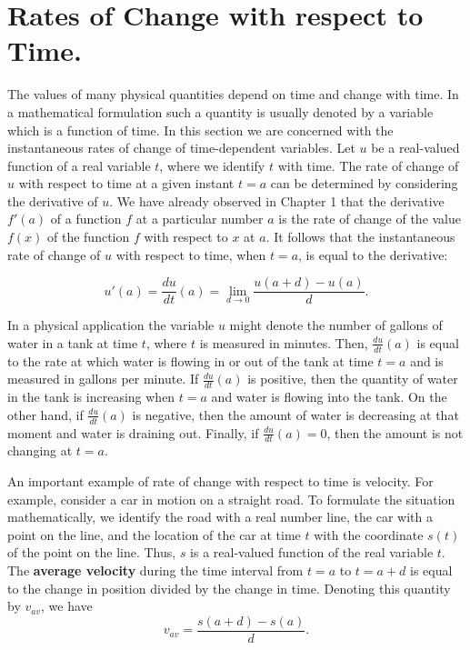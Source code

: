 \section{Rates of Change with respect to Time.}\label{sec 2.3}
The values of many physical quantities depend on time and change with time. In a mathematical formulation such a quantity is usually denoted by a variable which is a function of time. In this section we are concerned with the instantaneous rates of change of time-dependent variables. Let $u$ be a real-valued function of a real variable $t$, where we identify $t$ with time. The rate of change of $u$ with respect to time at a given instant $t = a$ can be determined by considering the derivative of $u$. We have already observed in Chapter 1 that the derivative $f'(a)$ of a function $f$ at a particular number $a$ is the rate of change of the value $f(x)$ of the function $f$ with respect to $x$ at $a$. It follows that the instantaneous rate of change of $u$ with respect to time, when $t = a$, is equal to the derivative:

$$
u'(a) = \frac{du}{dt} (a) = \lim_{d \rightarrow 0}\frac{u(a + d) - u(a)}{d}.
$$

In a physical application the variable $u$ might denote the number of gallons of water in a tank at time $t$, where $t$ is measured in minutes. Then, $\frac{du}{dt}(a)$ is equal to the rate at which water is flowing in or out of the tank at time $t = a$ and is measured in gallons per minute. If $\frac{du}{dt}(a)$ is positive, then the quantity of water in the tank is increasing when $t = a$ and water is flowing into the tank. On the other hand, if $\frac{du}{dt}(a)$ is negative, then the amount of water is decreasing at that moment and water is draining out. Finally, if $\frac{du}{dt}(a) = 0$, then the amount is not changing
at $t = a$.

An important example of rate of change with respect to time is velocity. For example, consider a car in motion on a straight road. To formulate the situation mathematically, we identify the road with a real number line, the car with a point on the line, and the location of the car at time $t$ with the coordinate $s(t)$ of the point on the line. Thus, $s$ is a real-valued function of
the real variable $t$. The \textbf{average velocity} during the time interval from $t = a$ to $t = a + d$ is equal to the change in position divided by the change in time. Denoting this quantity by $v_{av}$, we have
$$
v_{av} = \frac{s(a + d) - s(a)}{d}.
$$

